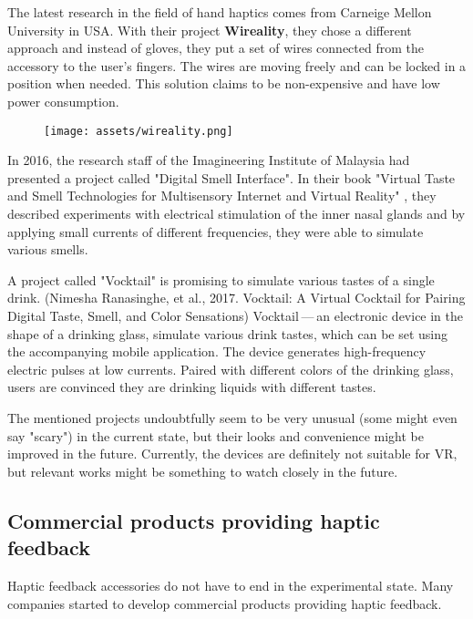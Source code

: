 The latest research in the field of hand haptics comes from Carneige Mellon
University in USA. With their project \textbf{Wireality}, they chose a different
approach and instead of gloves, they put a set of wires connected from the
accessory to the user’s fingers. The wires are moving freely and can be locked
in a position when needed. This solution claims to be non-expensive and
have low power consumption. \hyperlink{wireality}{}


\begin{figure}[h]{}
\centering\texttt{[image: assets/wireality.png]}
\caption{}

\end{figure}

In 2016, the research staff of the Imagineering Institute of Malaysia
had presented a project called "Digital Smell Interface". In their book
"Virtual Taste and Smell Technologies for Multisensory Internet and Virtual
Reality" \hyperlink{vrstmivr}{}, they described experiments with electrical stimulation
of the inner nasal glands and by applying small currents of different
frequencies, they were able to simulate various smells.


A project called "Vocktail" is promising to simulate various tastes of a single
drink.
(Nimesha Ranasinghe, et al., 2017. Vocktail: A Virtual Cocktail for Pairing
Digital Taste, Smell, and Color Sensations) \hyperlink{vocktail}{} Vocktail — an electronic
device in the shape of a drinking glass, simulate various drink tastes,
which can be set using the accompanying mobile application. The device
generates high-frequency electric pulses at low currents. Paired with
different colors of the drinking glass, users are convinced they are drinking
liquids with different tastes.


The mentioned projects undoubtfully seem to be very unusual
(some might even say "scary") in the current state, but their looks and convenience
might be improved in the future. Currently, the devices are definitely not
suitable for VR, but relevant works might be something to
watch closely in the future.


\hypertarget{x-commercial-products-providing-haptic-feedback}{\subsection*{Commercial products providing haptic feedback}}
Haptic feedback accessories do not have to end in the experimental state.
Many companies started to develop commercial products providing haptic feedback.


